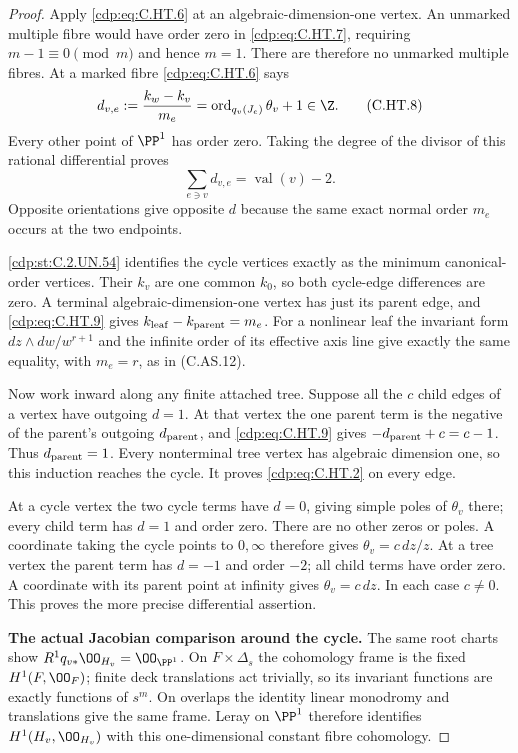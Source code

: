 \begin{proof}
Apply \eqref{cdp:eq:C.HT.6} at an algebraic-dimension-one vertex. An unmarked
multiple fibre would have order zero in \eqref{cdp:eq:C.HT.7}, requiring
$m-1\equiv0\pmod m$ and hence $m=1$. There are therefore no
unmarked multiple fibres. At a marked fibre \eqref{cdp:eq:C.HT.6} says
\[
 d_{v,e}:=\frac{k_w-k_v}{m_e}
       =\operatorname{ord}_{q_v(J_e)}\theta_v+1\in\Z.
                                                        \tag{C.HT.8}\label{cdp:eq:C.HT.8}
\]
Every other point of $\PP^1$ has order zero. Taking the degree of
the divisor of this rational differential proves
\[
                    \sum_{e\ni v}d_{v,e}
                           =\operatorname{val}(v)-2.   \tag{C.HT.9}\label{cdp:eq:C.HT.9}
\]
Opposite orientations give opposite $d$ because the same exact
normal order $m_e$ occurs at the two endpoints.

\ref{cdp:st:C.2.UN.54} identifies the cycle vertices exactly as the minimum
canonical-order vertices. Their $k_v$ are one common $k_0$,
so both cycle-edge differences are zero. A terminal
algebraic-dimension-one vertex has just its parent edge, and
\eqref{cdp:eq:C.HT.9} gives $k_{\rm leaf}-k_{\rm parent}=m_e$.
For a nonlinear leaf the invariant form
$dz\wedge dw/w^{r+1}$ and the infinite order of its effective
axis line give exactly the same equality, with $m_e=r$,
as in (C.AS.12).

Now work inward along any finite attached tree. Suppose all the
$c$ child edges of a vertex have outgoing $d=1$. At that vertex
the one parent term is the negative of the parent's outgoing
$d_{\rm parent}$, and \eqref{cdp:eq:C.HT.9} gives
$-d_{\rm parent}+c=c-1$. Thus $d_{\rm parent}=1$.
Every nonterminal tree vertex has algebraic dimension one, so this
induction reaches the cycle. It proves \eqref{cdp:eq:C.HT.2} on every edge.

At a cycle vertex the two cycle terms have $d=0$, giving simple
poles of $\theta_v$ there; every child term has $d=1$ and order
zero. There are no other zeros or poles. A coordinate taking the
cycle points to $0,\infty$ therefore gives $\theta_v=c\,dz/z$.
At a tree vertex the parent term has $d=-1$ and order $-2$;
all child terms have order zero. A coordinate with its parent
point at infinity gives $\theta_v=c\,dz$. In each case $c\ne0$.
This proves the more precise differential assertion.

\par\medskip\noindent\textbf{The actual Jacobian comparison around the cycle.}
The same root charts show $R^1q_{v*}\OO_{H_v}=\OO_{\PP^1}$.
On $F\times\Delta_s$ the cohomology frame is the fixed
$H^1(F,\OO_F)$; finite deck translations act trivially, so its
invariant functions are exactly functions of $s^m$. On overlaps
the identity linear monodromy and translations give the same
frame. Leray on $\PP^1$ therefore identifies
$H^1(H_v,\OO_{H_v})$ with this one-dimensional constant fibre
cohomology.


\end{proof}
